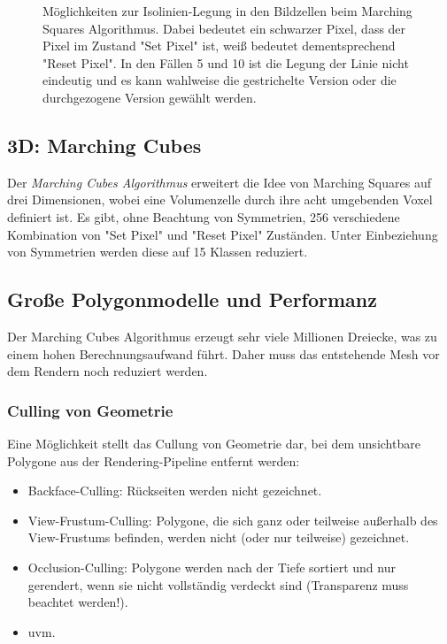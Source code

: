 \begin{figure}
				\caption{Möglichkeiten zur Isolinien-Legung in den Bildzellen beim Marching Squares Algorithmus. Dabei bedeutet ein schwarzer Pixel, dass der Pixel im Zustand "Set Pixel" ist, weiß bedeutet dementsprechend "Reset Pixel". In den Fällen \num{5} und \num{10} ist die Legung der Linie nicht eindeutig und es kann wahlweise die gestrichelte Version oder die durchgezogene Version gewählt werden.}
				\label{fig:marchingsquares}
			\end{figure}

		\subsection{3D: Marching Cubes}
			Der \emph{Marching Cubes Algorithmus} erweitert die Idee von Marching Squares auf drei Dimensionen, wobei eine Volumenzelle durch ihre acht umgebenden Voxel definiert ist. Es gibt, ohne Beachtung von Symmetrien, \num{256} verschiedene Kombination von "Set Pixel" und "Reset Pixel" Zuständen. Unter Einbeziehung von Symmetrien werden diese auf \num{15} Klassen reduziert.

		\subsection{Große Polygonmodelle und Performanz}
			Der Marching Cubes Algorithmus erzeugt sehr viele Millionen Dreiecke, was zu einem hohen Berechnungsaufwand führt. Daher muss das entstehende Mesh vor dem Rendern noch reduziert werden.

			\subsubsection{Culling von Geometrie}
				Eine Möglichkeit stellt das Cullung von Geometrie dar, bei dem unsichtbare Polygone aus der Rendering-Pipeline entfernt werden:
				\begin{itemize}
					\item Backface-Culling: Rückseiten werden nicht gezeichnet.
					\item View-Frustum-Culling: Polygone, die sich ganz oder teilweise außerhalb des View-Frustums befinden, werden nicht (oder nur teilweise) gezeichnet.
					\item Occlusion-Culling: Polygone werden nach der Tiefe sortiert und nur gerendert, wenn sie nicht vollständig verdeckt sind (Transparenz muss beachtet werden!).
					\item uvm.
				\end{itemize}

